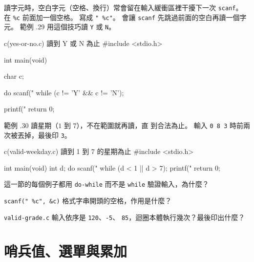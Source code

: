 讀字元時，空白字元（空格、換行）常會留在輸入緩衝區裡干擾下一次
\texttt{scanf}。 在 \texttt{\%c} 前面加一個空格。 寫成 \texttt{" \%c"}。 
會讓 \texttt{scanf} 先跳過前面的空白再讀一個字元。 範例 \thechapter.29
用這個技巧讀 \texttt{Y} 或 \texttt{N}。

\begin{example}{c}{(yes-or-no.c) 讀到 Y 或 N 為止}
#include <stdio.h>

int main(void) {
    char c;

    do {
        scanf(" %
    } while (c != 'Y' && c != 'N');

    printf("%
    return 0;
}
\end{example}



範例 \thechapter.30 讀星期（$1$ 到 $7$），不在範圍就再讀，直
到合法為止。 輸入 \texttt{0 8 3} 時前兩次被丟掉，最後印 \texttt{3}。

\begin{example}{c}{(valid-weekday.c) 讀到 1 到 7 的星期為止}
#include <stdio.h>

int main(void) {
    int d;
    do {
        scanf("%
    } while (d < 1 || d > 7);
    printf("%
    return 0;
}
\end{example}

\begin{drills}[label=drills:loop-input-validation]
\item 這一節的每個例子都用 \texttt{do-while} 而不是 \texttt{while}
驗證輸入，為什麼？
\item \texttt{scanf(" \%c", \&c)} 格式字串開頭的空格，作用是什麼？
\item \texttt{valid-grade.c} 輸入依序是 \texttt{120}、\texttt{-5}、
\texttt{85}，迴圈本體執行幾次？最後印出什麼？
\end{drills}

\section{哨兵值、選單與累加}
\label{sec:loop-sentinel}

